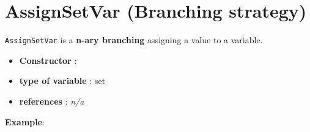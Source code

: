 \section{AssignSetVar (Branching strategy)}\label{assignsetvar:assignsetvarbranchstrat}\hypertarget{assignsetvar:assignsetvarbranchstrat}{}
\begin{notedef}
  \texttt{AssignSetVar} is a \textbf{n-ary branching} assigning a value to a variable.
\end{notedef}

\begin{itemize}
	\item \textbf{Constructor} :
	\item \textbf{type of variable} : set
	\item \textbf{references} : \emph{n/a}
\end{itemize}

\textbf{Example}:
%

